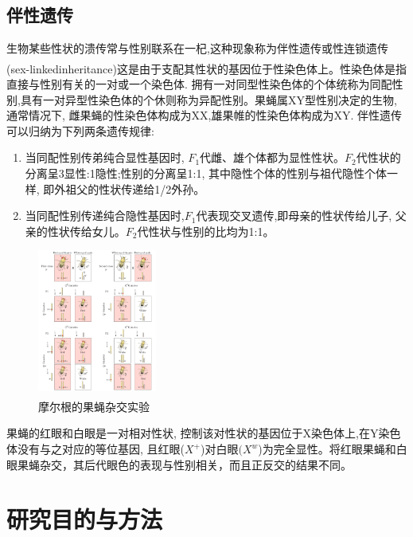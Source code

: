 \documentclass[AutoFakeBold]{LZUThesis}
\newcommand{\upcite}[1]{\textsuperscript{\textsuperscript{\cite{#1}}}}
\begin{document}
\section{伴性遗传}
生物某些性状的溃传常与性别联系在一杞,这种现象称为伴性遗传或性连锁遗传(sex-linkedinheritance)\upcite{morgen-sexlinkage}这是由于支配其性状的基因位于性染色体上。性染色体是指
直接与性别有关的一对或一个染色体. 拥有一对同型性染色体的个体统称为同配性别,具有一对异型性染色体的个休则称为异配性别。果蝇属XY型性别决定的生物, 通常情况下, 雌果蝇的性染色体构成为XX,雄果帷的性染色体构成为XY.
伴性遗传可以归纳为下列两条遗传规律:\par
\begin{enumerate}
\item 当同配性别传弟纯合显性基因时, $F_1$代雌、雄个体都为显性性状。$F_2$代性状的分离呈3显性:1隐性;性别的分离呈1:1, 其中隐性个体的性别与祖代隐性个体一样, 即外祖父的性状传递给1/2外孙。\par
\item 当同配性别传递纯合隐性基因时,$F_1$代表现交叉遗传,即母亲的性状传给儿子, 父亲的性状传给女儿。$F_2$代性状与性别的比均为1:1。\par
\end{enumerate}

\begin{figure}[hbtp]
    \centering
    \includegraphics[width=0.35\textwidth]{img/Sex-linked_inheritance}
    \caption{摩尔根的果蝇杂交实验\upcite{sex-linked-inheritance}}
    \label{fig:3}
\end{figure}

\indent 果蝇的红眼和白眼是一对相对性状, 控制该对性状的基因位于X染色体上,在Y染色体没有与之对应的等位基因, 且红眼($X^+$)对白眼$(X^w$)为完全显性。将红眼果蝇和白眼果蝇杂交，其后代眼色的表现与性别相关，而且正反交的结果不同。\par

\chapter{研究目的与方法}
\end{document}
